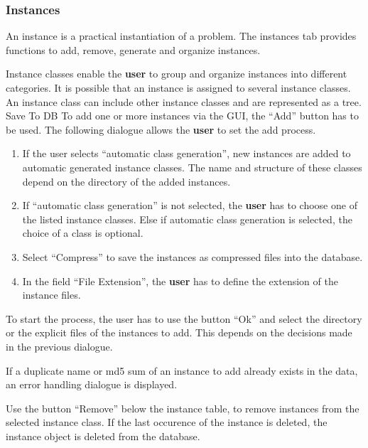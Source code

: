 \subsubsection{Instances}
 An instance is a practical instantiation of a problem. The instances tab provides functions to add, remove, generate and organize instances.

 Instance classes enable the \textbf{user} to group and organize instances into different categories. It is possible that an instance is assigned to several instance classes. An instance class can include other instance classes and are represented as a tree.
Save To DB
 To add one or more instances via the GUI, the ``Add'' button  has to be used. The following dialogue allows the \textbf{user} to set the add process.
\begin{enumerate}
	\item If the user selects ``automatic class generation'', new instances are added to automatic generated instance classes. The name and structure of these classes depend on the directory of the added instances.
	
	\item If ``automatic class generation'' is not selected, the \textbf{user} has to choose one of the listed instance classes. Else if automatic class generation is selected, the choice of a class is optional.
	
	\item Select ``Compress'' to save the instances as compressed files into the database.
	
	\item In the field ``File Extension'', the \textbf{user} has to define the extension of the instance files.
\end{enumerate}

To start the process, the user has to use the button ``Ok'' and select the directory  or the explicit files of the instances to add. This depends on the decisions made in the previous dialogue.

\attention If a duplicate name or md5 sum of an instance to add already exists in the \edacc data, an error handling dialogue is displayed. 
 
 Use the button ``Remove'' below the instance table, to remove instances from the selected instance class. If the last occurence of the instance is deleted, the instance object is deleted from the database.

